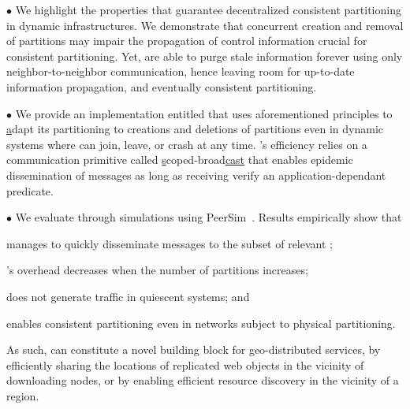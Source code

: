 \begin{asparadesc} %
\item [$\bullet$] We highlight the properties that guarantee
  decentralized consistent partitioning in dynamic infrastructures. We
  demonstrate that concurrent creation and removal of partitions may
  impair the propagation of control information crucial for consistent
  partitioning. Yet, \processes are able to purge stale information
  forever using only neighbor-to-neighbor communication, hence leaving
  room for up-to-date information propagation, and eventually
  consistent partitioning.
  
\item [$\bullet$] We provide an implementation entitled \NAME that
  uses aforementioned principles to \underline{a}dapt its partitioning
  to creations and deletions of partitions even in dynamic systems
  where \nodes can join, leave, or crash at any time. \NAME's
  efficiency relies on a communication primitive called
  \underline{s}coped-broad\underline{cast} that enables epidemic
  dissemination of messages as long as receiving \processes verify an
  application-dependant predicate.

\item [$\bullet$] We evaluate \NAME through simulations using
  PeerSim~\cite{montresor2009peersim}. Results empirically show that
  \begin{inparaenum}[(i)]
  \item \NAME manages to quickly disseminate messages to the subset of
    relevant \processes;
  \item \NAME's overhead decreases when the number of partitions
    increases;
  \item \NAME does not generate traffic in quiescent systems; and
  \item \NAME enables consistent partitioning even in networks subject
    to physical partitioning.
  \end{inparaenum}
\end{asparadesc}

As such, \NAME can constitute a novel building block for
geo-distributed services, \eg by efficiently sharing the locations of
replicated web objects in the vicinity of downloading nodes, or by
enabling efficient resource discovery in the vicinity of a region.


